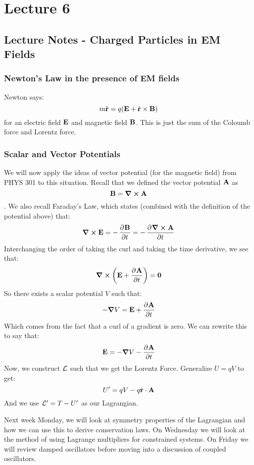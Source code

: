 \section{Lecture 6}
\subsection{Lecture Notes - Charged Particles in EM Fields}
\subsubsection{Newton's Law in the presence of EM fields}
Newton says:
\[m\ddot{\mathbf{r}} = q(\mathbf{E} + \dot{\mathbf{r}}\times \mathbf{B})\] for an electric field $\mathbf{E}$ and magnetic field $\mathbf{B}$. This is just the sum of the Coloumb force and Lorentz force.

\subsubsection{Scalar and Vector Potentials}
We will now apply the ideas of vector potential (for the magnetic field) from PHYS 301 to this situation. Recall that we defined the vector potential $\mathbf{A}$ as \[\mathbf{B} = \curl{\ensuremath{\mathbf{A}}}\].
We also recall Faraday's Law, which states (combined with the definition of the potential above) that:
\[\curl{\v{E}} = -\dpd{\v{B}}{t} = -\dpd{\curl{\v{A}}}{t}\]
Interchanging the order of taking the curl and taking the time derivative, we see that:
\[\curl{\left(\v{E} + \dpd{\v{A}}{t}\right)} = \v{0}\]
So there exists a scalar potential $V$ such that:
\[-\grad{V} = \v{E} + \dpd{\v{A}}{t}\]
Which comes from the fact that a curl of a gradient is zero. We can rewrite this to say that:
\[\v{E} = -\grad{V} - \dpd{\v{A}}{t}\]
Now, we construct $\mathcal{L}$ such that we get the Lorentz Force. Generalize $U = qV$ to get:
\[U' = qV - q\dot{\mathbf{r}}\cdot\mathbf{A}\]
And we use $\mathcal{L}' = T - U'$ as our Lagrangian.

Next week Monday, we will look at symmetry properties of the Lagrangian and how we can use this to derive conservation laws. On Wednesday we will look at the method of using Lagrange multipliers for constrained systems. On Friday we will review damped oscillators before moving into a discussion of coupled oscillators.
